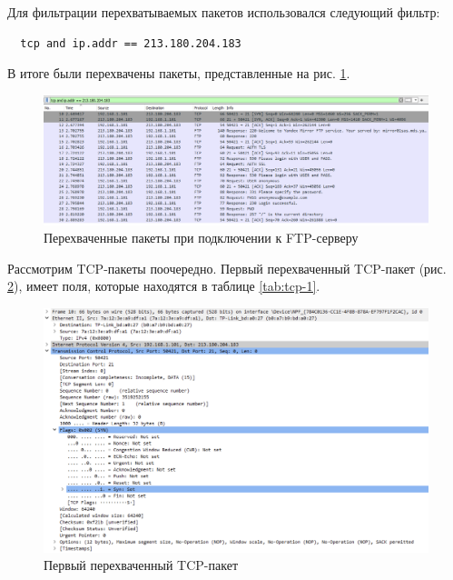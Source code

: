 \documentclass[a4paper, 14pt]{extarticle}
\begin{document}
Для фильтрации перехватываемых пакетов использовался следующий фильтр:
\begin{verbatim}
  tcp and ip.addr == 213.180.204.183
\end{verbatim}
В итоге были перехвачены пакеты, представленные на рис. \ref{fig:tcp-result}.

\begin{figure}[H]
  \centering
  \includegraphics[width=\textwidth]{images/tcp-result.png}
  \caption{Перехваченные пакеты при подключении к FTP-серверу}
  \label{fig:tcp-result}
\end{figure}

Рассмотрим TCP-пакеты поочередно. Первый перехваченный TCP-пакет (рис.
\ref{fig:tcp-1}), имеет поля, которые находятся в таблице \ref{tab:tcp-1}.

\begin{figure}[H]
  \centering
  \includegraphics[width=\textwidth]{images/tcp-1.png}
  \caption{Первый перехваченный TCP-пакет}
  \label{fig:tcp-1}
\end{figure}
\end{document}
